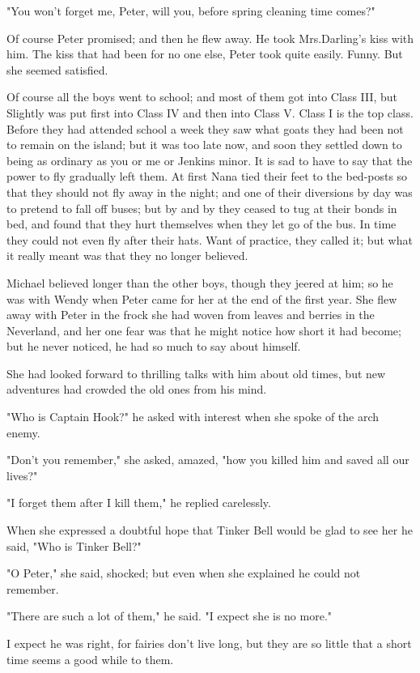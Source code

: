"You won't forget me, Peter, will you, before spring cleaning time comes?"

Of course Peter promised;
and then he flew away.
He took Mrs.\@ Darling's kiss with him.
The kiss that had been for no one else, Peter took quite easily.
Funny.
But she seemed satisfied.

Of course all the boys went to school;
and most of them got into Class III, but Slightly was put first into Class IV and then into Class V\@.
Class I is the top class.
Before they had attended school a week they saw what goats they had been not to remain on the island;
but it was too late now, and soon they settled down to being as ordinary as you or me or Jenkins minor.
It is sad to have to say that the power to fly gradually left them.
At first Nana tied their feet to the bed-posts so that they should not fly away in the night;
and one of their diversions by day was to pretend to fall off buses;
but by and by they ceased to tug at their bonds in bed, and found that they hurt themselves when they let go of the bus.
In time they could not even fly after their hats.
Want of practice, they called it;
but what it really meant was that they no longer believed.

Michael believed longer than the other boys, though they jeered at him;
so he was with Wendy when Peter came for her at the end of the first year.
She flew away with Peter in the frock she had woven from leaves and berries in the Neverland, and her one fear was that he might notice how short it had become;
but he never noticed, he had so much to say about himself.

She had looked forward to thrilling talks with him about old times, but new adventures had crowded the old ones from his mind.

"Who is Captain Hook?\@" he asked with interest when she spoke of the arch enemy.

"Don't you remember," she asked, amazed, "how you killed him and saved all our lives?"

"I forget them after I kill them," he replied carelessly.

When she expressed a doubtful hope that Tinker Bell would be glad to see her he said, "Who is Tinker Bell?"

"O Peter," she said, shocked;
but even when she explained he could not remember.

"There are such a lot of them," he said.
"I expect she is no more."

I expect he was right, for fairies don't live long, but they are so little that a short time seems a good while to them.

